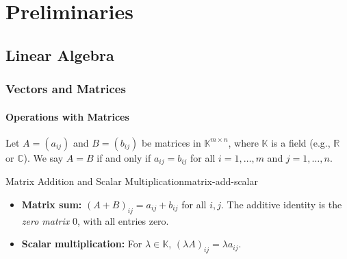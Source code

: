 \chapter{Preliminaries}

\section{Linear Algebra}

\subsection{Vectors and Matrices}

\subsubsection{Operations with Matrices}

Let \(A = (a_{ij})\) and \(B = (b_{ij})\) be matrices in \(\mathbb{K}^{m \times n}\), where \(\mathbb{K}\) is a field (e.g., \(\mathbb{R}\) or \(\mathbb{C}\)). We say \(A = B\) if and only if \(a_{ij} = b_{ij}\) for all \(i = 1,\ldots,m\) and \(j = 1,\ldots,n\).

\begin{definition}{Matrix Addition and Scalar Multiplication}{matrix-add-scalar}

    \begin{itemize}[nosep]
        \item \textbf{Matrix sum:} \((A+B)_{ij} = a_{ij} + b_{ij}\) for all \(i,j\). The additive identity is the \emph{zero matrix} \(0\), with all entries zero.
        \item \textbf{Scalar multiplication:} For \(\lambda \in \mathbb{K}\), \((\lambda A)_{ij} = \lambda a_{ij}\).
    \end{itemize}

\end{definition}

